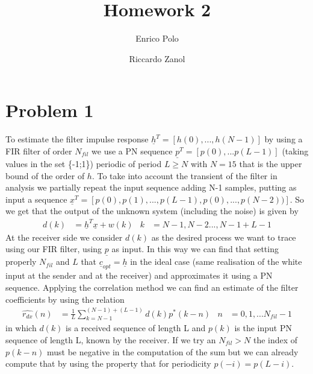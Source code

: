 \documentclass[a4paper,oneside]{article}
\author{Enrico Polo \and Riccardo Zanol}
\title{Homework 2}
\renewcommand{\vec}[1]{\underline{#1}}
\begin{document}
\maketitle
\section*{Problem 1}
To estimate the filter impulse response $\vec{h}^T = [h(0), ..., h(N-1)]$ by using a FIR filter of order $N_{fil}$ we use a PN sequence $\vec{p}^T = [p(0),...p(L-1)]$ (taking values in the set \{-1;1\}) periodic of period $L\geq N$ with $N=15$ that is the upper bound of the order of $h$. To take into account the transient of the filter in analysis we partially repeat the input sequence adding N-1 samples, putting as input a sequence $\vec{x}^T = [p(0), p(1),...,p(L-1),p(0),...,p(N-2))]$. So we get that the output of the unknown system (including the noise) is given by 
\begin{align*}
d(k)& = \vec{h}^T \vec{x} + w(k)&  k& = N-1,N-2...,N-1+L-1
\end{align*}
At the receiver side we consider $d(k)$ as the desired process we want to trace using our FIR filter, using $\vec{p}$ as input. In this way we can find that setting properly $N_{fil}$ and $L$ that $\vec{c}_{opt} = \vec{h}$ in the ideal case (same realisation of the white input at the sender and at the receiver) and approximates it using a PN sequence. 
\newline Applying the correlation method we can find an estimate of the filter coefficients by using the relation 
\begin{align*}
\hat{r_{dx}}(n) &= \frac{1}{L} \sum_{k=N-1}^{(N-1) + (L-1)} {d(k)p^*(k-n)} & n&=0,1,...N_{fil} -1
\end{align*}
in which $d(k)$ is a received sequence of length L and $p(k)$ is the input PN sequence of length L, known by the receiver. If we try an $N_{fil} > N$ the index of $p(k-n)$ must be negative in the computation of the sum but we can already compute that by using the property that for periodicity $p(-i) = p(L-i)$. 
\end{document}
